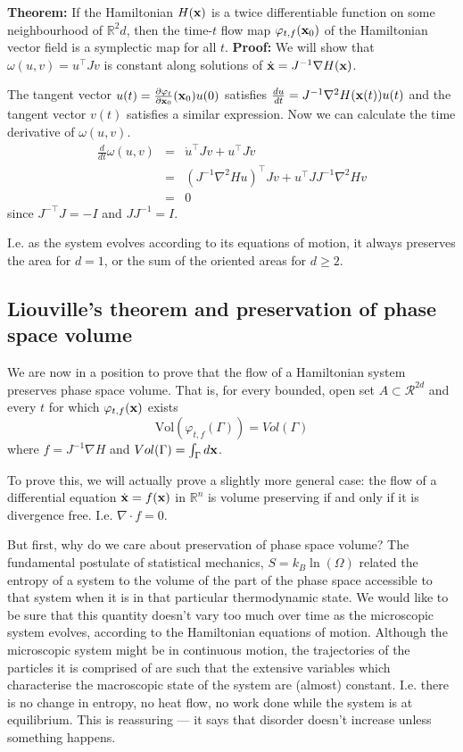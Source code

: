 \documentclass{article}
\begin{document}
{\bf Theorem:} If the Hamiltonian $H({\bf x})$ is a twice differentiable function on some neighbourhood of $\mathbb{R}^2d$, then the time-$t$ flow map $\varphi_{t,f}({\bf x}_0)$ of the Hamiltonian vector field is a symplectic map for all $t$.
{\bf Proof:} We will show that $\omega(u,v)=u^\top J v$ is constant along solutions of $\dot{\bf x} = J^{-1}\nabla H({\bf x})$.

The tangent vector $u(t) = \frac{\partial \varphi_t}{\partial {\bf x}_0}({\bf x}_0)u(0)$ satisfies $\frac{du}{dt} = J^{-1}\nabla^2H({\bf x}(t))u(t)$ and the tangent vector $v(t)$ satisfies a similar expression. Now we can calculate the time derivative of $\omega(u,v)$.
\begin{eqnarray*}
	\frac{d}{dt}\omega(u,v) &=& \dot{u}^{\top}Jv+u^\top J\dot{v}\\
		&=& (J^{-1}\nabla^2Hu)^\top Jv + u^\top JJ^{-1}\nabla^2Hv\\
		&=& 0
\end{eqnarray*}
since $J^{-\top}J=-I$ and $JJ^{-1} = I$.

I.e. as the system evolves according to its equations of motion, it always preserves the area for $d=1$, or the sum of the oriented areas for $d \geq2$.


\subsection*{Liouville's theorem and preservation of phase space volume}
We are now in a position to prove that the flow of a Hamiltonian system preserves phase space volume. That is, for every bounded, open set $A\subset\mathcal{R}^{2d}$ and every $t$ for which $\varphi_{t,f}({\bf x})$ exists
$$\text{Vol}(\varphi_{t,f}(\Gamma))=Vol(\Gamma)$$
where $f=J^{-1}\nabla H$ and $Vol(\Gamma) = \int_{\Gamma}d{\bf x}$.

To prove this, we will actually prove a slightly more general case: the flow of a differential equation $\dot{\bf x}=f({\bf x})$ in $\mathbb{R}^n$ is volume preserving if and only if it is divergence free. I.e. $\nabla\cdot f=0$.

But first, why do we care about preservation of phase space volume? The fundamental postulate of statistical mechanics, $S=k_B\ln(\Omega)$ related the entropy of a system to the volume of the part of the phase space accessible to that system when it is in that particular thermodynamic state. We would like to be sure that this quantity doesn't vary too much over time as the microscopic system evolves, according to the Hamiltonian equations of motion. Although the microscopic system might be in continuous motion, the trajectories of the particles it is comprised of are such that the extensive variables which characterise the macroscopic state of the system are (almost) constant. I.e. there is no change in entropy, no heat flow, no work done while the system is at equilibrium. This is reassuring --- it says that disorder doesn't increase unless something happens.
\end{document}
